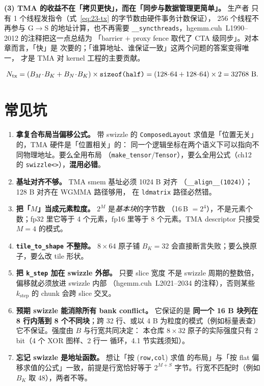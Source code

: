 \textbf{(3) TMA 的收益不在「拷贝更快」，而在「同步与数据管理更简单」。} 生产者
只有 1 个线程发指令（式~\eqref{eq:23-tx} 的字节数由硬件事务计数保证），
256 个线程不再参与 G$\to$S 的地址计算，也不再需要
\texttt{\_\allowbreak{}\_\allowbreak{}syncthreads}，hgemm.cuh~L1990--2012 的注释把这一点总结为
「barrier $+$ proxy fence 取代了 CTA 级同步」。对本章而言，「快」是
次要的；「谁算地址、谁保证一致」这两个问题的答案变得唯一，
才是 TMA 对 kernel 工程的主要贡献。

\begin{equation}
\label{eq:23-tx}
N_{\text{tx}} = (B_M\!\cdot\!B_K + B_N\!\cdot\!B_K)\times
\texttt{sizeof\allowbreak{}(half)} = (128\!\cdot\!64+128\!\cdot\!64)\times2 = 32768\ \text{B}.
\end{equation}

\section{常见坑}

\begin{enumerate}[leftmargin=2.2em]
\item \textbf{拿复合布局当偏移公式。} 带 swizzle 的
\texttt{Composed\allowbreak{}Layout} 求值是「位置无关」的，TMA 硬件是「位置相关」的：
同一个逻辑坐标在两个语义下可以指向不同物理地址。要么全用布局
（\texttt{make\_tensor}/\texttt{Tensor}），要么全用公式（ch12 的
\texttt{swizzle<>}），\textbf{混用必错}。
\item \textbf{基址对齐不够。} TMA smem 基址必须 1024 B 对齐
（\texttt{\_\allowbreak{}\_\allowbreak{}align\_\allowbreak{}\_\allowbreak{}(1024)}）；128 B 对齐在 WGMMA 路径够用，
在 \texttt{ldmatrix} 路径必然错。
\item \textbf{把「$M$」当成元素粒度。} $2^M$ 是\emph{基本块}的字节数
（16\,B $=2^4$），不是元素个数；fp32 里它等于 4 个元素，fp16 里等于
8 个元素。TMA descriptor 只接受 $M=4$ 的模式。
\item \textbf{\texttt{tile\_\allowbreak{}to\_\allowbreak{}shape} 不整除。} $8\times64$ 原子铺
$B_K=32$ 会直接断言失败；要么换原子，要么改 tile 形状。
\item \textbf{把 \texttt{k\_step} 加在 swizzle 外部。} 只要 slice 宽度
不是 swizzle 周期的整数倍，偏移就必须放进 swizzle 内部
（hgemm.cuh~L2021--2034 的注释），否则某些 $k_{\text{step}}$ 的
chunk 会跨 slice 交叉。
\item \textbf{预期 swizzle 能消除所有 bank conflict。} 它保证的是
\textbf{同一个 16 B 块列在 8 行内落到 8 个不同块}；跨 32 行、或以
4 B 为粒度的模式（例如标量表查）它不保证。强度由 $B$ 与行宽共同决定：
本仓库 $8\times32$ 原子的实际强度只有 2 bit（4 个 XOR 图样、2 行一
循环，4.1 节实践须知）。
\item \textbf{忘记 swizzle 是地址函数。} 想让「按 (\texttt{row,col}) 求值
的布局」与「按 flat 偏移求值的公式」一致，前提是行宽恰好等于
$2^{M+S}$ 字节。行宽不匹配时（例如 $B_K$ 取 48），两者不等。
\end{enumerate}

